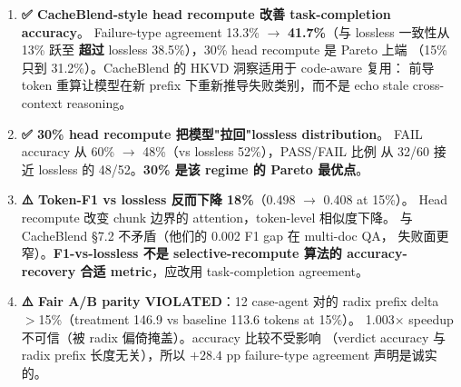 \documentclass[11pt,a4paper]{article}
\begin{document}
\begin{enumerate}
  \item \textbf{✅ CacheBlend-style head recompute 改善 task-completion accuracy}。
        Failure-type agreement 13.3\% $\to$ \textbf{41.7\%}（与 lossless 一致性从 13\%
        跃至 \textbf{超过} lossless 38.5\%），30\% head recompute 是 Pareto 上端
        （15\% 只到 31.2\%）。CacheBlend 的 HKVD 洞察适用于 code-aware 复用：
        前导 token 重算让模型在新 prefix 下重新推导失败类别，而不是 echo
        stale cross-context reasoning。
  \item \textbf{✅ 30\% head recompute 把模型"拉回"lossless distribution}。
        FAIL accuracy 从 60\% $\to$ 48\%（vs lossless 52\%），PASS/FAIL 比例
        从 32/60 接近 lossless 的 48/52。\textbf{30\% 是该 regime 的 Pareto 最优点}。
  \item \textbf{⚠️ Token-F1 vs lossless 反而下降 18\%}（0.498 $\to$ 0.408 at 15\%）。
        Head recompute 改变 chunk 边界的 attention，token-level 相似度下降。
        与 CacheBlend §7.2 不矛盾（他们的 0.002 F1 gap 在 multi-doc QA，
        失败面更窄）。\textbf{F1-vs-lossless 不是 selective-recompute
        算法的 accuracy-recovery 合适 metric}，应改用 task-completion agreement。
  \item \textbf{⚠️ Fair A/B parity VIOLATED}：12 case-agent 对的 radix prefix
        delta $>$15\%（treatment 146.9 vs baseline 113.6 tokens at 15\%）。
        1.003$\times$ speedup 不可信（被 radix 偏倚掩盖）。accuracy 比较不受影响
        （verdict accuracy 与 radix prefix 长度无关），所以 $+28.4$ pp failure-type
        agreement 声明是诚实的。
\end{enumerate}
\end{document}
